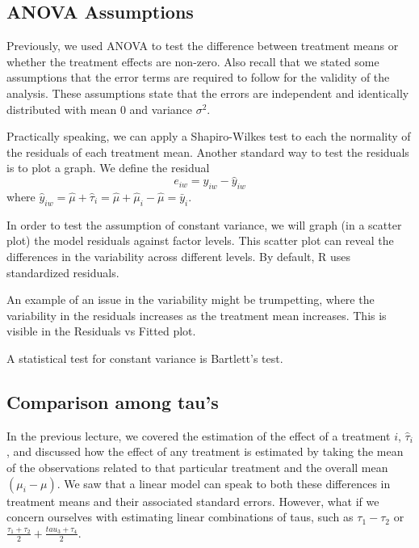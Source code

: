 \documentclass{tufte-book}
\begin{document}
\subsection{ANOVA Assumptions}

Previously, we used ANOVA to test the difference between treatment means or whether the treatment effects are non-zero. 
Also recall that we stated some assumptions that the error terms are required to follow for the validity of the analysis. 
These assumptions state that the errors are independent and identically distributed with mean 0 and variance $\sigma^{2}$. \newline

Practically speaking, we can apply a Shapiro-Wilkes test to each the normality of the residuals of each treatment
 mean. Another standard way to test the residuals is to plot a graph. We define the residual 
\[e_{iw} = y_{iw} - \hat{y}_{iw}\] where $\hat{y}_{iw} = \hat{\mu} + \hat{\tau}_{i} = \hat{\mu} + 
\hat{\mu}_{i} - \hat{\mu} = \bar{y}_{i}$. \newline

In order to test the assumption of constant variance, we will graph (in a scatter plot) the model residuals against factor 
levels. This scatter plot can reveal the differences in the variability across different levels. By default, R uses standardized 
residuals.\newline

An example of an issue in the variability might be trumpetting, where the variability in the residuals increases as the 
treatment mean increases. This is visible in the Residuals vs Fitted plot. \newline

A statistical test for constant variance is Bartlett's test.

\subsection{Comparison among tau's}

In the previous lecture, we covered the estimation of the effect of a treatment $i$, $\hat{\tau}_{i}$, and discussed 
how the effect of any treatment is estimated by taking the mean of the observations related to that particular treatment 
and the overall mean $(\mu_{i} - \mu)$. We saw that a linear model can speak to both these differences in treatment means 
and their associated standard errors. However, what if we concern ourselves with estimating linear combinations of taus, 
such as $\tau_{1} - \tau_{2}$ or $\frac{\tau_{1} + \tau_{2}}{2} + \frac{tau_{3} + \tau_{4}}{2}$. \newline
\end{document}
